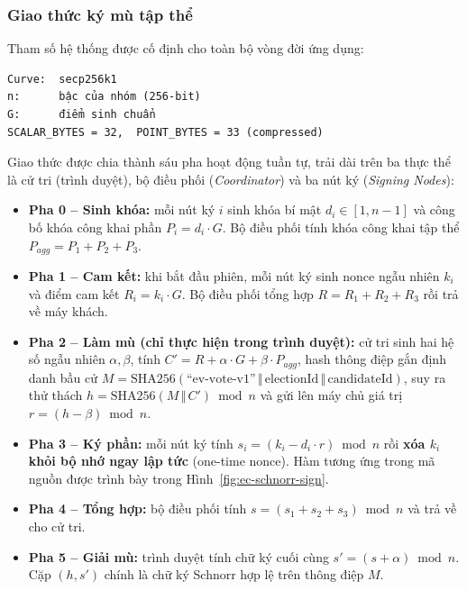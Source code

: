 \subsubsection{Giao thức ký mù tập thể}

Tham số hệ thống được cố định cho toàn bộ vòng đời ứng dụng:

\begin{verbatim}
Curve:  secp256k1
n:      bậc của nhóm (256-bit)
G:      điểm sinh chuẩn
SCALAR_BYTES = 32,  POINT_BYTES = 33 (compressed)
\end{verbatim}

Giao thức được chia thành sáu pha hoạt động tuần tự, trải dài trên ba thực thể là cử tri (trình duyệt), bộ điều phối (\textit{Coordinator}) và ba nút ký (\textit{Signing Nodes}):

\begin{itemize}
    \item \textbf{Pha 0 -- Sinh khóa:} mỗi nút ký $i$ sinh khóa bí mật $d_i \in [1, n-1]$ và công bố khóa công khai phần $P_i = d_i \cdot G$. Bộ điều phối tính khóa công khai tập thể $P_{agg} = P_1 + P_2 + P_3$.

    \item \textbf{Pha 1 -- Cam kết:} khi bắt đầu phiên, mỗi nút ký sinh nonce ngẫu nhiên $k_i$ và điểm cam kết $R_i = k_i \cdot G$. Bộ điều phối tổng hợp $R = R_1 + R_2 + R_3$ rồi trả về máy khách.

    \item \textbf{Pha 2 -- Làm mù (chỉ thực hiện trong trình duyệt):} cử tri sinh hai hệ số ngẫu nhiên $\alpha, \beta$, tính $C' = R + \alpha \cdot G + \beta \cdot P_{agg}$, hash thông điệp gắn định danh bầu cử $M = \text{SHA256}(\text{``ev-vote-v1''} \,\Vert\, \text{electionId} \,\Vert\, \text{candidateId})$, suy ra thử thách $h = \text{SHA256}(M \,\Vert\, C') \bmod n$ và gửi lên máy chủ giá trị $r = (h - \beta) \bmod n$.

    \item \textbf{Pha 3 -- Ký phần:} mỗi nút ký tính $s_i = (k_i - d_i \cdot r) \bmod n$ rồi \textbf{xóa $k_i$ khỏi bộ nhớ ngay lập tức} (one-time nonce). Hàm tương ứng trong mã nguồn được trình bày trong Hình~\ref{fig:ec-schnorr-sign}.

    \item \textbf{Pha 4 -- Tổng hợp:} bộ điều phối tính $s = (s_1 + s_2 + s_3) \bmod n$ và trả về cho cử tri.

    \item \textbf{Pha 5 -- Giải mù:} trình duyệt tính chữ ký cuối cùng $s' = (s + \alpha) \bmod n$. Cặp $(h, s')$ chính là chữ ký Schnorr hợp lệ trên thông điệp $M$.
\end{itemize}


